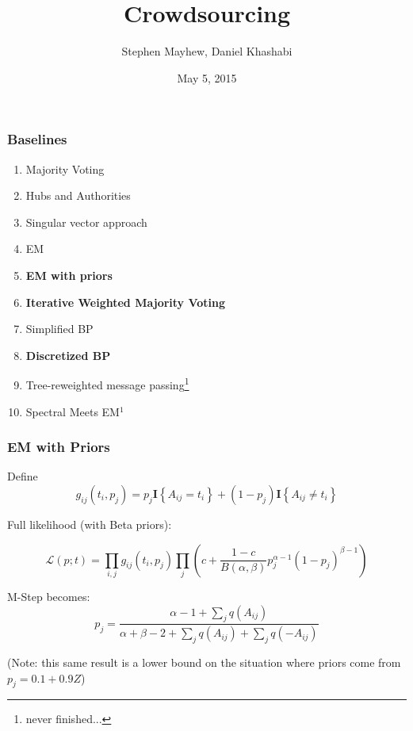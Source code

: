 \documentclass[10pt, compress, onlymath]{beamer}
\title{Crowdsourcing}
\subtitle{}
\date{May 5, 2015}
\author{Stephen Mayhew, Daniel Khashabi}
\institute{University of Illinois at Urbana Champaign}
\begin{document}
\maketitle

\begin{frame}[fragile]
  \frametitle{Baselines}
  \begin{enumerate}
  \item Majority Voting
  \item Hubs and Authorities
  \item Singular vector approach
  \item EM
  \item \textbf<2>{EM with priors}
  \item \textbf<2>{Iterative Weighted Majority Voting}
  \item Simplified BP
  \item \textbf<2>{Discretized BP}
  \item Tree-reweighted message passing\footnote{never finished...}
  \item Spectral Meets EM$^1$
  \end{enumerate}


\end{frame}


\begin{frame}[fragile]
  \frametitle{EM with Priors}
Define
\[g_{ij}(t_i, p_j) = p_j \mathbf{I} \left\lbrace  A_{ij}=  t_i  \right\rbrace +  (1-p_j ) \mathbf{I} \left\lbrace  A_{ij} \neq  t_i  \right\rbrace\]


\pause
Full likelihood (with Beta priors):

\[ \mathcal{L}(p; t) = \prod_{i,j} g_{ij}(t_i,p_j) \prod_j \left( c+ \frac{1-c}{B(\alpha, \beta)} p_j^{\alpha-1} (1-p_j)^{\beta-1}  \right) \]
\pause

M-Step becomes:
\[
p_j = \frac{ \alpha - 1 + \sum_jq(A_{ij}) }{ \alpha + \beta-2 + \sum_jq(A_{ij})  + \sum_j q(-A_{ij})  }
\]

(Note: this same result is a lower bound on the situation where priors come from $p_j = 0.1 + 0.9Z$)

\end{frame}
\end{document}
